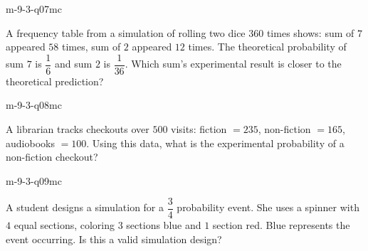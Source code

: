 \begin{practiceQuestion}{m-9-3-q07}{mc}
\begin{questionText}
A frequency table from a simulation of rolling two dice $360$ times shows: sum of $7$ appeared $58$ times, sum of $2$ appeared $12$ times. The theoretical probability of sum $7$ is $\dfrac{1}{6}$ and sum $2$ is $\dfrac{1}{36}$. Which sum's experimental result is closer to the theoretical prediction?
\end{questionText}
\end{practiceQuestion}

\begin{practiceQuestion}{m-9-3-q08}{mc}
\begin{questionText}
A librarian tracks checkouts over $500$ visits: fiction $= 235$, non-fiction $= 165$, audiobooks $= 100$. Using this data, what is the experimental probability of a non-fiction checkout?
\end{questionText}
\end{practiceQuestion}

\begin{practiceQuestion}{m-9-3-q09}{mc}
\begin{questionText}
A student designs a simulation for a $\dfrac{3}{4}$ probability event. She uses a spinner with $4$ equal sections, coloring $3$ sections blue and $1$ section red. Blue represents the event occurring. Is this a valid simulation design?
\end{questionText}
\end{practiceQuestion}

